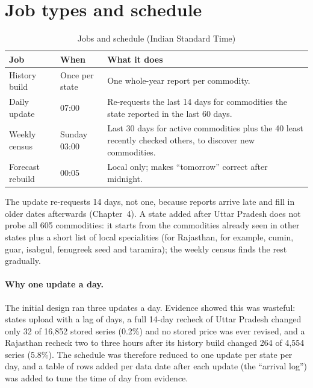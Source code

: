 \documentclass[12pt,a4paper,oneside]{report}
\numberwithin{equation}{chapter}
\numberwithin{figure}{chapter}
\numberwithin{table}{chapter}
\theoremstyle{definition}
\begin{document}
\section{Job types and schedule}\label{sec:jobs}
\begin{table}[H]
\centering
\caption{Jobs and schedule (Indian Standard Time)}
\label{tab:jobs}
\small
\begin{tabular}{@{}p{}p{}p{}@{}}
\toprule
Job & When & What it does \\
\midrule
History build & Once per state & One whole-year report per commodity. \\
Daily update & 07:00 & Re-requests the last 14 days for commodities the state reported in the last 60 days. \\
Weekly census & Sunday 03:00 & Last 30 days for active commodities plus the 40 least recently checked others, to discover new commodities. \\
Forecast rebuild & 00:05 & Local only; makes ``tomorrow'' correct after midnight. \\
\bottomrule
\end{tabular}
\end{table}
The update re-requests 14 days, not one, because reports arrive late and fill in older dates afterwards (Chapter~4). A state added after Uttar Pradesh does not probe all 605 commodities: it starts from the commodities already seen in other states plus a short list of local specialities (for Rajasthan, for example, cumin, guar, isabgul, fenugreek seed and taramira); the weekly census finds the rest gradually.

\paragraph{Why one update a day.} The initial design ran three updates a day. Evidence showed this was wasteful: states upload with a lag of days, a full 14-day recheck of Uttar Pradesh changed only 32 of 16{,}852 stored series (0.2\%) and no stored price was ever revised, and a Rajasthan recheck two to three hours after its history build changed 264 of 4{,}554 series (5.8\%). The schedule was therefore reduced to one update per state per day, and a table of rows added per data date after each update (the ``arrival log'') was added to tune the time of day from evidence.
\end{document}
